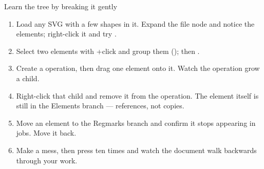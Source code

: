 \begin{tryit}{Learn the tree by breaking it gently}
\begin{enumerate}[label=\arabic*.,leftmargin=1.4em]
  \item Load any SVG with a few shapes in it. Expand the file node and notice the
        elements; right-click it and try .
  \item Select two elements with +click and group them
        (); then .
  \item Create a  operation, then drag one element onto it. Watch
        the operation grow a child.
  \item Right-click that child and remove it from the operation. The element
        itself is still in the Elements branch --- references, not copies.
  \item Move an element to the Regmarks branch and confirm it stops appearing in
        jobs. Move it back.
  \item Make a mess, then press  ten times and watch the document
        walk backwards through your work.
\end{enumerate}
\end{tryit}
